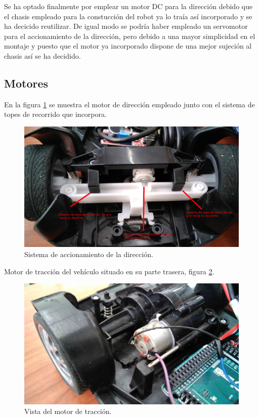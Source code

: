 Se ha optado finalmente por emplear un motor DC para la dirección debido que el chasis empleado para la constucción del robot ya lo traía así incorporado y se ha decicido reutilizar.
De igual modo se podría haber empleado un servomotor para el accionamiento de la dirección, pero debido a una mayor simplicidad en el montaje y puesto que el motor ya incorporado
dispone de una mejor sujeción al chasis así se ha decidido.\\

\subsection{Motores}

En la figura \ref{img:sistema_direccion} se muestra el motor de dirección empleado junto con el sistema de topes de recorrido que incorpora.\\


\begin{figure}[H]
  \begin{center}
    \includegraphics[scale=0.2]{imagenes/robot/motor-direccion.jpg}
  \end{center}
  \caption{Sistema de accionamiento de la dirección.}
  \label{img:sistema_direccion}
\end{figure}

Motor de tracción del vehículo situado en su parte trasera, figura \ref{img:motor_traccion}.

\begin{figure}[H]
  \begin{center}
    \includegraphics[scale=0.2]{imagenes/robot/motor-traccion.jpeg}
  \end{center}
  \caption{Vista del motor de tracción.}
  \label{img:motor_traccion}
\end{figure}


